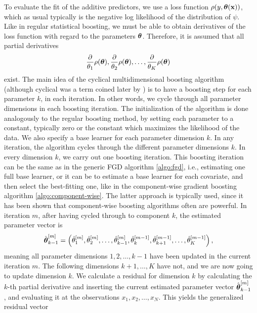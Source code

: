 To evaluate the fit of the additive predictors, we use a loss function $\rho(y,\boldsymbol{\theta}(\mathbf{x}))$, which as usual typically is the negative log likelihood of the distribution of $\psi$. Like in regular statistical boosting, we must be able to obtain derivatives of the loss function with regard to the parameters $\boldsymbol{\theta}$. Therefore, it is assumed that all partial derivatives
\begin{equation}
    \frac{\partial}{\theta_1}\rho(\boldsymbol{\theta}),\frac{\partial}{\theta_2}\rho(\boldsymbol{\theta}),\ldots,\frac{\partial}{\theta_K}\rho(\boldsymbol{\theta})
\end{equation}
exist. The main idea of the cyclical multidimensional boosting algorithm (although cyclical was a term coined later by \citet{thomas2018}) is to have a boosting step for each parameter $k$, in each iteration. In other words, we cycle through all parameter dimensions in each boosting iteration. The initialization of the algorithm is done analogously to the regular boosting method, by setting each parameter to a constant, typically zero or the constant which maximizes the likelihood of the data. We also specify a base learner for each parameter dimension $k$. In any iteration, the algorithm cycles through the different parameter dimensions $k$. In every dimension $k$, we carry out one boosting iteration. This boosting iteration can be the same as in the generic FGD algorithm \eqref{algo:fgd}, i.e., estimating one full base learner, or it can be to estimate a base learner for each covariate, and then select the best-fitting one, like in the component-wise gradient boosting algorithm \eqref{algo:component-wise}. The latter approach is typically used, since it has been shown that component-wise boosting algorithms often are powerful. In iteration $m$, after having cycled through to component $k$, the estimated parameter vector is
\begin{equation*}
    \hat{\boldsymbol{\theta}}_{k-1}^{[m]}=\left(\hat{\theta}_1^{[m]},\hat{\theta}_2^{[m]},\ldots,\hat{\theta}_{k-1}^{[m]},\hat{\theta}_{k}^{[m-1]},\hat{\theta}_{k+1}^{[m-1]},\ldots,\hat{\theta}_{K}^{[m-1]}\right),
\end{equation*}
meaning all parameter dimensions $1,2,\ldots,k-1$ have been updated in the current iteration $m$. The following dimensions $k+1,\ldots,K$ have not, and we are now going to update dimension $k$. We calculate a residual for dimension $k$ by calculating the $k$-th partial derivative and inserting the current estimated parameter vector $\hat{\boldsymbol{\theta}}_{k-1}^{[m]}$, and evaluating it at the observations $x_1,x_2,\ldots,x_N$. This yields the generalized residual vector
